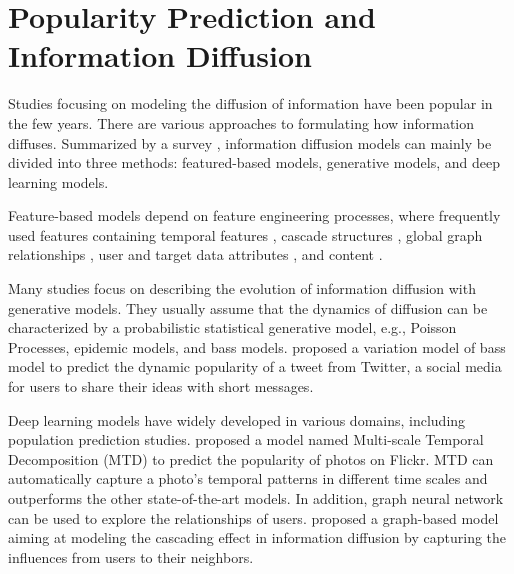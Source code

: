 \section{Popularity Prediction and Information Diffusion}

Studies focusing on modeling the diffusion of information have been popular in the few years. There are various approaches to formulating how information diffuses. Summarized by a survey \cite{2021}, information diffusion models can mainly be divided into three methods: featured-based models, generative models, and deep learning models. 

Feature-based models depend on feature engineering processes, where frequently used features containing temporal features \cite{8731564}, cascade structures \cite{8428538}, global graph relationships \cite{10.1145/2567948.2577312}, user and target data attributes \cite{8428538}, and content \cite{wu2018views}.

Many studies focus on describing the evolution of information diffusion with generative models. They usually assume that the dynamics of diffusion can be characterized by a probabilistic statistical generative model, e.g., Poisson Processes, epidemic models, and bass models. \cite{8896027} proposed a variation model of bass model to predict the dynamic popularity of a tweet from Twitter, a social media for users to share their ideas with short messages.

Deep learning models have widely developed in various domains, including population prediction studies. \cite{Wu_Mei_Cheng_Zhang_2016} proposed a model named Multi-scale Temporal Decomposition (MTD) to predict the popularity of photos on Flickr. MTD can automatically capture a photo's temporal patterns in different time scales and outperforms the other state-of-the-art models. In addition, graph neural network can be used to explore the relationships of users. \cite{cao2019popularity} proposed a graph-based model aiming at modeling the cascading effect in information diffusion by capturing the influences from users to their neighbors.